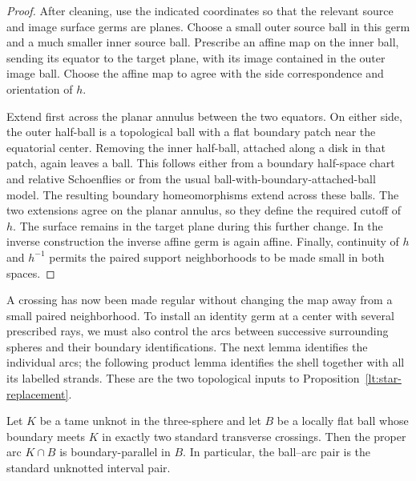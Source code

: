 \begin{proof}
After cleaning, use the indicated coordinates so that the relevant
source and image surface germs are planes.  Choose a small outer source
ball in this germ and a much smaller inner source ball.  Prescribe an
affine map on the inner ball, sending its equator to the target plane,
with its image contained in the outer image ball.  Choose the affine
map to agree with the side correspondence and orientation of $h$.

Extend first across the planar annulus between the two equators.
On either side, the outer half-ball is a topological ball with a flat
boundary patch near the equatorial center.  Removing the inner
half-ball, attached along a disk in that patch, again leaves a ball.
This follows either from a boundary half-space chart and relative
Schoenflies or from the usual ball-with-boundary-attached-ball model.
The resulting boundary homeomorphisms extend across these balls.
The two extensions agree on the planar annulus, so they define the
required cutoff of $h$.  The surface remains in the target plane during
this further change.  In the inverse construction the inverse affine
germ is again affine.  Finally, continuity of $h$ and $h^{-1}$ permits
the paired support neighborhoods to be made small in both spaces.
\end{proof}

A crossing has now been made regular without changing the map away
from a small paired neighborhood. To install an identity germ at a
center with several prescribed rays, we must also control the arcs
between successive surrounding spheres and their boundary
identifications. The next lemma identifies the individual arcs; the
following product lemma identifies the shell together with all its
labelled strands. These are the two topological inputs to
Proposition~\ref{lt:star-replacement}.

\begin{lemma}\label{lt:unknot-cut}
Let $K$ be a tame unknot in the three-sphere and let $B$ be a locally
flat ball whose boundary meets $K$ in exactly two standard transverse
crossings.  Then the proper arc $K\cap B$ is boundary-parallel in $B$.
In particular, the ball--arc pair is the standard unknotted interval
pair.
\end{lemma}

